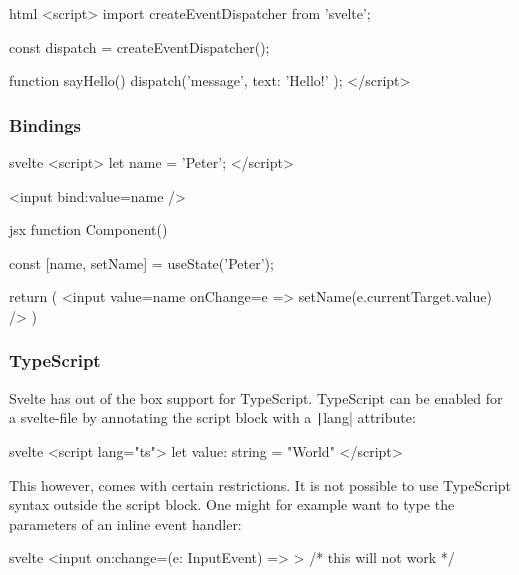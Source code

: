 \begin{myminted}{html}{}
<script>
    import { createEventDispatcher } from 'svelte';

    const dispatch = createEventDispatcher();

    function sayHello() {
        dispatch('message', {
            text: 'Hello!'
        });
    }
</script>
\end{myminted}

\subsubsection{Bindings}


\begin{myminted}{svelte}{}
<script>
    let name = 'Peter';
</script>

<input bind:value={name} />
\end{myminted}

\begin{myminted}{jsx}{}
function Component() {
    const [name, setName] = useState('Peter');

    return ( 
        <input 
            value={name}
            onChange={e => setName(e.currentTarget.value)} 
        />
    )
}
\end{myminted}

\subsubsection{TypeScript}

Svelte has out of the box support for TypeScript. TypeScript can be enabled for a svelte-file by annotating the  script block with a \texttt|lang| attribute:

\begin{myminted}{svelte}{}
<script lang="ts">
    let value: string = "World"
</script>
\end{myminted}

This however, comes with certain restrictions. It is not possible to use TypeScript syntax outside the script block. One might for example want to type the parameters of an inline event handler:

\begin{myminted}{svelte}{}
<input on:change={(e: InputEvent) => {}}> /* this will not work */ 
\end{myminted}

